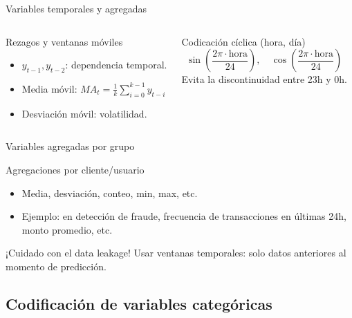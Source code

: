 \documentclass[aspectratio=169, 10pt, xcolor=table]{beamer}
\begin{document}
\begin{frame}{Variables temporales y agregadas}
    \begin{columns}[t]
        \begin{block}{Rezagos y ventanas móviles}
            \begin{itemize}
                \item $y_{t-1}, y_{t-2}$: dependencia temporal.
                \item Media móvil: $MA_t = \frac{1}{k}\sum_{i=0}^{k-1} y_{t-i}$
                \item Desviación móvil: volatilidad.
            \end{itemize}
        \end{block}
        \begin{block}{Codicación cíclica (hora, día)}
            \[
            \sin\left(\frac{2\pi \cdot \text{hora}}{24}\right),\quad \cos\left(\frac{2\pi \cdot \text{hora}}{24}\right)
            \]
            Evita la discontinuidad entre 23h y 0h.
        \end{block}
    \end{columns}
\end{frame}

\begin{frame}{Variables agregadas por grupo}
    \begin{block}{Agregaciones por cliente/usuario}
        \begin{itemize}
            \item Media, desviación, conteo, min, max, etc.
            \item Ejemplo: en detección de fraude, frecuencia de transacciones en últimas 24h, monto promedio, etc.
        \end{itemize}
    \end{block}
    \begin{alertblock}{¡Cuidado con el data leakage!}
        Usar ventanas temporales: solo datos anteriores al momento de predicción.
    \end{alertblock}
\end{frame}

\subsection{Codificación de variables categóricas}
\end{document}
